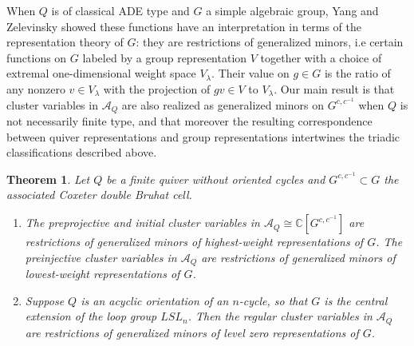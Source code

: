 \documentclass[12pt]{amsart}
\newcommand{\cA}{\mathcal{A}}
\newcommand{\CC}{\mathbb{C}}
\newtheorem{theorem}{Theorem}[section]
\theoremstyle{remark}
\numberwithin{equation}{section}
\numberwithin{figure}{section}
\begin{document}

When $Q$ is of classical ADE type and $G$ a simple algebraic group, Yang and Zelevinsky \cite{YZ08} showed these functions have an interpretation in terms of the representation theory of $G$: they are restrictions of generalized minors, i.e certain functions on $G$ labeled by a group representation $V$ together with a choice of extremal one-dimensional weight space $V_\lambda$. 
Their value on $g \in G$ is the ratio of any nonzero $v \in V_\lambda$ with the projection of $gv \in V$ to $V_\lambda$. 
Our main result is that cluster variables in $\cA_Q$ are also realized as generalized minors on $G^{c,c^{-1}}$ when $Q$ is not necessarily finite type, and that moreover the resulting correspondence between quiver representations and group representations intertwines the triadic classifications described above.

\begin{theorem}\label{thm:maintheorem}
Let $Q$ be a finite quiver without oriented cycles and $G^{c,c^{-1}} \subset G$ the associated Coxeter double Bruhat cell.
\begin{enumerate}
\item The preprojective and initial cluster variables in $\cA_Q \cong \CC[G^{c,c^{-1}}]$ are restrictions of generalized minors of highest-weight representations of $G$. The preinjective cluster variables in $\cA_Q$ are restrictions of generalized minors of lowest-weight representations of $G$.
\item Suppose $Q$ is an acyclic orientation of an $n$-cycle, so that $G$ is the central extension of the loop group $LSL_{n}$. Then the regular cluster variables in $\cA_Q$ are restrictions of generalized minors of level zero representations of $G$.
\end{enumerate}
\end{theorem}
\end{document}
